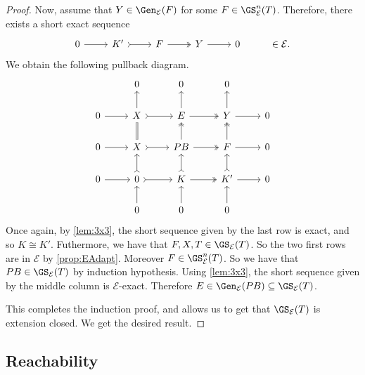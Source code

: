 \begin{proof}
Now, assume that $Y \in \Gen_\mathcal{E}(F)$ for some $F \in \GS_\mathcal{E}^n(T)$. Therefore, there exists a short exact sequence \[\begin{tikzcd}
	0 & K' & F  & Y &  0 & \in \mathcal{E}.
	\arrow[from=1-1, to=1-2]
	\arrow[tail, from=1-2, to=1-3]
	\arrow[two heads,from=1-3, to=1-4]
	\arrow[from=1-4, to=1-5]
\end{tikzcd} \] We obtain the following pullback diagram.
\[\begin{tikzcd}
         & 0 & 0 & 0 &  \\
	0 & X & E  & Y &  0 \\
     0 & X & PB & F & 0 \\
      0 & 0 & K & K' & 0 \\
       & 0 & 0 & 0 & 
	\arrow[from=2-1, to=2-2]
	\arrow[tail, from=2-2, to=2-3]
	\arrow[two heads,from=2-3, to=2-4]
	\arrow[from=2-4, to=2-5]
        \arrow[from=3-1, to=3-2]
	\arrow[tail, from=3-2, to=3-3]
	\arrow[two heads,from=3-3, to=3-4]
	\arrow[from=3-4, to=3-5]
        \arrow[from=4-1, to=4-2]
	\arrow[tail, from=4-2, to=4-3]
	\arrow[two heads,from=4-3, to=4-4]
	\arrow[from=4-4, to=4-5]
        \arrow[from=5-2, to=4-2]
	\arrow[tail, from=4-2, to=3-2]
	\arrow[equals,from=3-2, to=2-2]
	\arrow[from=2-2, to=1-2]
        \arrow[from=5-3, to=4-3]
	\arrow[tail, from=4-3, to=3-3]
	\arrow[two heads,from=3-3, to=2-3]
	\arrow[from=2-3, to=1-3]
        \arrow[from=5-4, to=4-4]
	\arrow[tail, from=4-4, to=3-4]
	\arrow[two heads,from=3-4, to=2-4]
	\arrow[from=2-4, to=1-4]
\end{tikzcd} \]
Once again, by \cref{lem:3x3}, the short sequence given by the last row is exact, and so $K \cong K'$. Futhermore, we have that $F,X,T \in \GS_{\mathcal{E}}(T)$. So the two first rows are in $\mathcal{E}$ by \cref{prop:EAdapt}. Moreover $F \in \GS^{n}_{\mathcal{E}}(T)$. So we have that $PB \in \GS_{\mathcal{E}}(T)$ by induction hypothesis. Using \cref{lem:3x3}, the short sequence given by the middle column is ${\mathcal{E}}$-exact. Therefore $E \in \Gen_\mathcal{E}(PB) \subseteq \GS_{\mathcal{E}}(T)$. 

This completes the induction proof, and allows us to get that $\GS_\mathcal{E}(T)$ is extension closed. We get the desired result.
\end{proof}

\subsection{Reachability}
\label{ss:reach}

